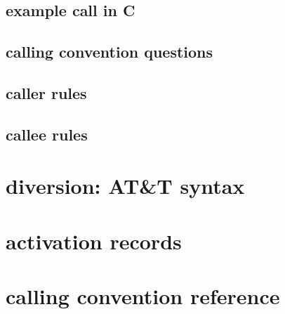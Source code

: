 

\subsection{example call in C}




\subsection{calling convention questions}


\subsection{caller rules}



\subsection{callee rules}

%












\section{diversion: AT&T syntax}



\section{activation records}


\section{calling convention reference}




